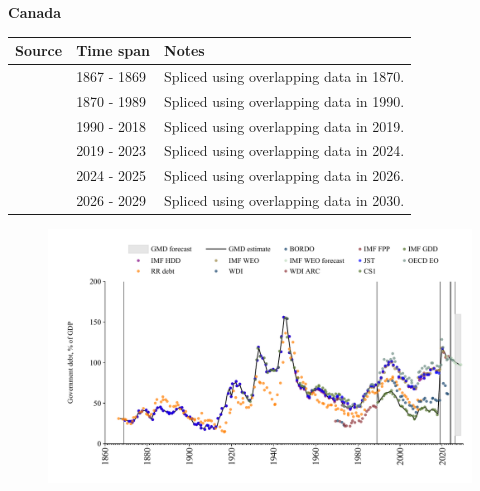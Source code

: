 \documentclass[12pt,a4paper,landscape]{article}
\begin{document}
\begin{adjustbox}{max totalsize={\paperwidth}{\paperheight},center}
\begin{minipage}[t][\textheight][t]{\textwidth}
\vspace*{0.5cm}
{}
\begin{center}
{\Large\bfseries Canada}
\end{center}
\vspace{0.5cm}
\begin{table}[H]
\centering
\small
\begin{tabular}{|l|l|l|}
\hline
\textbf{Source} & \textbf{Time span} & \textbf{Notes} \\
\hline
\rowcolor{white}\cite{RR_debt}& 1867 - 1869 &Spliced using overlapping data in 1870.\\
\rowcolor{lightgray}\cite{IMF_FPP}& 1870 - 1989 &Spliced using overlapping data in 1990.\\
\rowcolor{white}\cite{IMF_GDD}& 1990 - 2018 &Spliced using overlapping data in 2019.\\
\rowcolor{lightgray}\cite{IMF_FPP}& 2019 - 2023 &Spliced using overlapping data in 2024.\\
\rowcolor{white}\cite{OECD_EO}& 2024 - 2025 &Spliced using overlapping data in 2026.\\
\rowcolor{lightgray}\cite{IMF_WEO_forecast}& 2026 - 2029 &Spliced using overlapping data in 2030.\\
\hline
\end{tabular}
\end{table}
\begin{figure}[H]
\centering
\includegraphics[width=\textwidth,height=0.6\textheight,keepaspectratio]{graphs/CAN_govdebt_GDP.pdf}
\end{figure}
\end{minipage}
\end{adjustbox}
\end{document}
